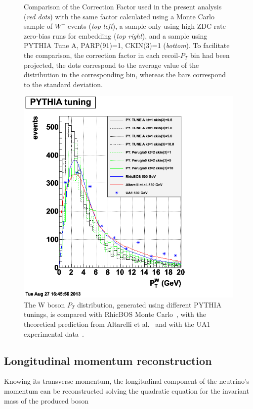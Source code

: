 \documentclass[12pt]{article}
\begin{document}
\begin{figure}[htbp]
\begin{center}
\end{center}
\caption{Comparison of the Correction Factor used in the present analysis ({\it red dots}) with the same factor calculated using a Monte Carlo sample of $W^{-}$ events ({\it top left}), a sample only using high ZDC rate zero-bias runs for embedding ({\it top right}), and a sample using PYTHIA Tune A, PARP(91)=1, CKIN(3)=1 ({\it bottom}). To facilitate the comparison, the correction factor in each recoil-$P_{T}$ bin had been projected, the dots correspond to the average value of the distribution in the corresponding bin, whereas the bars correspond to the standard deviation.}
\label{fig:plot_PtCorrFactor_ZDChigh_ProfileX}
\end{figure}

\begin{figure}[htbp]
\begin{center}
\includegraphics[scale=0.7]{images/Pt-Recoil-study/plot_WPT_2}
\end{center}
\caption{The W boson $P_{T}$ distribution, generated using different PYTHIA tunings, is compared with RhicBOS Monte Carlo~\cite{RhicBOS}, with the theoretical prediction from Altarelli et al.~\cite{Altarelli} and with the UA1 experimental data~\cite{UA1}.}
\label{fig:plot_PYTHIA_Tune}
\end{figure}

\subsection{Longitudinal momentum reconstruction}
Knowing its transverse momentum, the longitudinal component of the neutrino's momentum can be reconstructed solving the quadratic equation for the invariant mass of the produced boson
\end{document}
